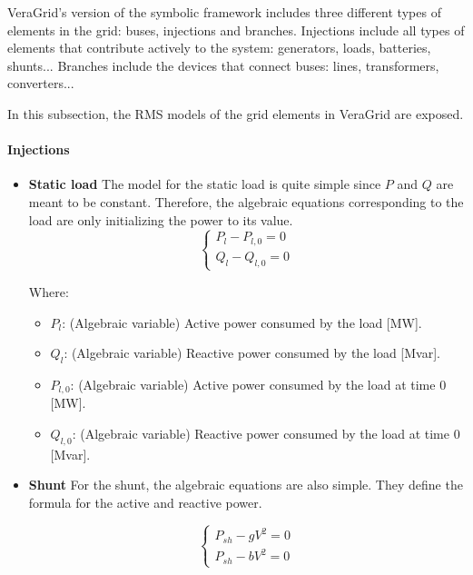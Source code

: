 VeraGrid's version of the symbolic framework includes three different types of elements in the grid: buses, injections and branches. Injections include all types of elements
that contribute actively to the system: generators, loads, batteries, shunts... Branches include the devices that connect buses: lines, transformers, converters... 

In this subsection, the RMS models of the grid elements in VeraGrid are exposed.

\paragraph{Injections}

\begin{itemize}
\item \textbf{Static load}
The model for the static load is quite simple since $P$ and $Q$ are meant to be constant. Therefore, the algebraic equations
corresponding to the load are only initializing the power to its value.
\begin{equation}
\begin{cases}
P_l -P_{l,0} = 0\\
Q_l -Q_{l,0} = 0
\end{cases}
\label{eq:alg_eq_load}
\end{equation}

Where:
\begin{itemize}
  \item $P_l$: (Algebraic variable) Active power consumed by the load [MW].
  \item $Q_l$: (Algebraic variable) Reactive power consumed by the load [Mvar].
  \item $P_{l,0}$: (Algebraic variable) Active power consumed by the load at time 0 [MW].
  \item $Q_{l,0}$: (Algebraic variable) Reactive power consumed by the load at time 0 [Mvar].
\end{itemize}

\item  \textbf{Shunt}
For the shunt, the algebraic equations are also simple. They define the formula for the active and reactive power.

\begin{equation}
\begin{cases}
P_{sh} - g V^2 = 0 \\
P_{sh} - b V^2 = 0
\end{cases}
\label{eq:alg_eq_shunt}
\end{equation}


\end{itemize}
